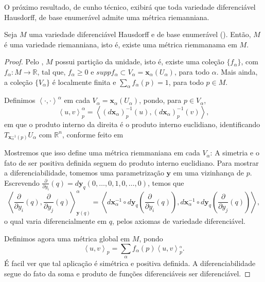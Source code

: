 O próximo resultado, de cunho técnico, exibirá que toda variedade diferenciável Hausdorff, de base enumerável admite uma métrica riemanniana.
\begin{theorem}
    \label{loc:2.10_:_prop_2_:_existência_de_métrica}
    Seja $M$ uma variedade diferenciável Hausdorff e de base enumerável (). Então, $M$ é uma variedade riemanniana, isto é, existe uma métrica riemmanama em $M$.
    \begin{proof}

        Pelo , $M$ possui partição da unidade, isto é, existe uma coleção $\{ f_{\alpha} \}$, com $f_{\alpha}:M\to \mathbb{R}$, tal que, $f_{\alpha}\geq0$ e $suppf_{\alpha}\subset V_{\alpha}=\mathbf{x}_{\alpha}(U_{\alpha})$, para todo $\alpha$. Mais ainda, a coleção $\{ V_{\alpha} \}$ é localmente finita e $\sum_{\alpha}f_{\alpha}(p)=1$, para todo $p \in M$.

        Definimos $\left<\cdot,\cdot\right>^{\alpha}$ em cada $V_{\alpha}=\mathbf{x}_{\alpha}(U_{\alpha})$, pondo, para $p \in V_{\alpha}$,
        \begin{equation*}
            \left<u,v\right>_{p}^{\alpha}=\left<(d\mathbf{x}_{\alpha})_{p}^{-1}(u),(d\mathbf{x}_{\alpha})_{p}^{-1}(v)\right>,
        \end{equation*}
        em que o produto interno da direita é o produto interno euclidiano, identificando $T_{\mathbf{x}_{\alpha}^{-1}(p)}U_{\alpha}$ com $\mathbb{R}^{n}$, conforme feito em 

        Mostremos que isso define uma métrica riemmaniana em cada $V_{\alpha}$:
        A simetria e o fato de ser positiva definida seguem do produto interno euclidiano. Para mostrar a diferenciabilidade, tomemos uma parametrização $\mathbf{y}$ em uma vizinhança de $p$. Escrevendo $\frac{\partial}{\partial y_{i}}(q)=d\mathbf{y}_{q}(0, \dots, 0, 1, 0, \dots, 0)$, temos que
        \begin{equation*}
            \left<\frac{\partial}{\partial y_{i}}(q),\frac{\partial}{\partial y_{j}}(q)\right>_{\mathbf{y}(q)}^{\alpha}=\left<d\mathbf{x}_{\alpha}^{-1} \circ d\mathbf{y}_{q}\left(\frac{\partial}{\partial y_{i}}(q)\right),d\mathbf{x}_{\alpha}^{-1} \circ d\mathbf{y}_{q}\left(\frac{\partial}{\partial y_{j}}(q)\right)\right>,
        \end{equation*}
        o qual varia diferencialmente em $q$, pelos axiomas de variedade diferenciável.

        Definimos agora uma métrica global em $M$, pondo
        \begin{equation*}
            \left<u,v\right>_{p}=\sum_{\alpha}f_{\alpha}(p)\left<u,v\right>_{p}^{_{\alpha}}.
        \end{equation*}
        É facil ver que tal aplicação é simétrica e positiva definida. A diferenciabilidade segue do fato da soma e produto de funções diferenciáveis ser diferenciável.
    \end{proof}
\end{theorem}
